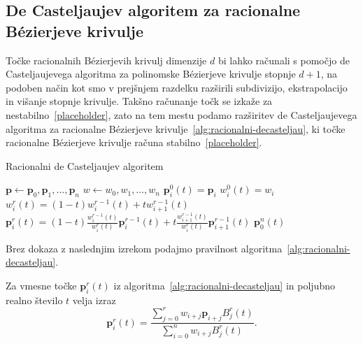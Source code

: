 \documentclass[isrm2, tisk]{fmfdelo}
\newcommand{\p}{\mathbf{p}}
\begin{document}
    \subsection{De Casteljaujev algoritem za racionalne Bézierjeve krivulje}
    Točke racionalnih Bézierjevih krivulj dimenzije $d$ bi lahko računali s pomočjo de Casteljaujevega algoritma za polinomske Bézierjeve krivulje stopnje $d+1$, na podoben način kot smo v prejšnjem razdelku razširili subdivizijo, ekstrapolacijo in višanje stopnje krivulje.
    Takšno računanje točk se izkaže za nestabilno~\ref{placeholder}, zato na tem mestu podamo razširitev de Casteljaujevega algoritma za racionalne Bézierjeve krivulje~\ref{alg:racionalni-decasteljau}, ki točke racionalne Bézierjeve krivulje računa stabilno~\ref{placeholder}.
    \begin{algorithm}[h!]
        \caption{Racionalni de Casteljaujev algoritem}
        \begin{algorithmic}
            \State $\p \gets \p_0,\p_1,\dots,\p_n$
            \State $w\gets w_0,w_1,\dots,w_n$
                \State $\p_i^0(t)=\p_i$
                \State $w_i^0(t)=w_i$
            \EndFor
                    \State $w_i^r(t)=(1-t)w_{i}^{r-1}(t)+tw_{i+1}^{r-1}(t)$
                    \State $\p_i^r(t)=(1-t)\frac{w_{i}^{r-1}(t)}{w_{i}^{r}(t)}\p_i^{r-1}(t)+t\frac{w_{i+1}^{r-1}(t)}{w_{i}^{r}(t)}\p_{i+1}^{r-1}(t)$
                \EndFor
            \EndFor
            \State \Return $\p_0^n(t)$
        \end{algorithmic}\label{alg:racionalni-decasteljau}
    \end{algorithm}

    \noindent Brez dokaza z naslednjim izrekom podajmo pravilnost algoritma~\ref{alg:racionalni-decasteljau}.
    \begin{izrek}
        Za vmesne točke $\p_i^r(t)$ iz algoritma~\ref{alg:racionalni-decasteljau} in poljubno realno število $t$ velja izraz
        \[\p_i^r(t)= \frac{\sum^{r}_{j=0}w_{i+j}\p_{i+j} B^r_j(t)}{\sum^{n}_{i=0}w_{i+j} B^r_j(t)}. \]
    \end{izrek}
\end{document}
